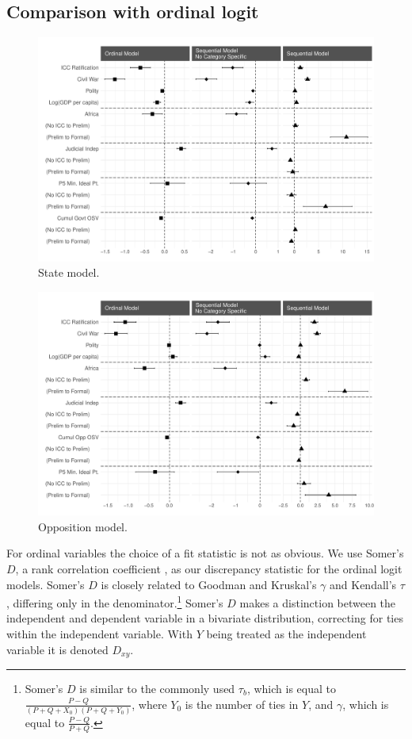 \subsection*{Comparison with ordinal logit}

\begin{figure}
    \centering
    \includegraphics[width=1\textwidth]{modCompare_state.pdf}
    \caption{State model.}
    \label{fig:stateCoefCompare}
\end{figure}

\begin{figure}
    \centering
    \includegraphics[width=1\textwidth]{modCompare_opp.pdf}
    \caption{Opposition model.}
    \label{fig:oppCoefCompare}
\end{figure}

For ordinal variables the choice of a fit statistic is not as obvious. We use Somer's $D$, a rank correlation coefficient  \citep{Somers1962}, as our discrepancy statistic for the ordinal logit models. Somer's $D$ is closely related to Goodman and Kruskal's $\gamma$ and Kendall's $\tau$, differing only in the denominator.\footnote{Somer's $D$ is similar to the commonly used $\tau_b$, which is equal to $\frac{P - Q}{(P+Q+X_0)(P+Q+Y_0)}$, where $Y_0$ is the number of ties in $Y$, and $\gamma$, which is equal to $\frac{P - Q}{P + Q}$.} Somer's $D$ makes a distinction between the independent and dependent variable in a bivariate distribution, correcting for ties within the independent variable. With $Y$ being treated as the independent variable it is denoted $D_{xy}$.

